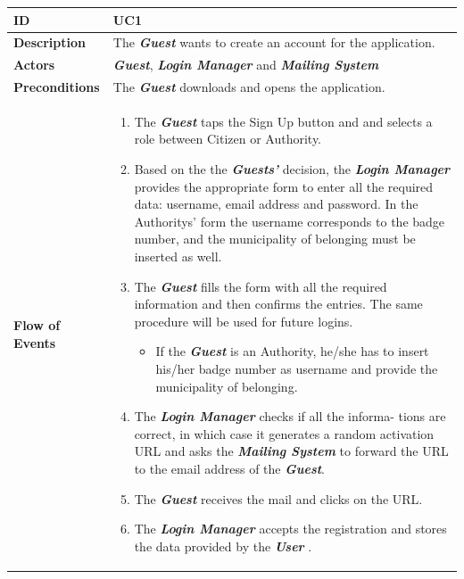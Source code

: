 \documentclass{report}
\begin{document}
\begin{tabularx}{\linewidth}{| l | X |}
	\hline
	\textbf{ID} & UC1\\
	
	\hline
	\textbf{Description} & The \textbf{\textit{Guest}} wants to create an account for the application.\\
	
	\hline
	\textbf{Actors} & \textbf{\textit{Guest}}, \textbf{\textit{Login Manager}} and \textbf{\textit{Mailing System}}\\
	
	\hline
	\textbf{Preconditions} & The \textbf{\textit{Guest}} downloads and opens the application.\\
	
	\hline
	\textbf{Flow of Events} & \parbox{0.7\textwidth}{	
		\begin{enumerate}
			\item The \textbf{\textit{Guest}} taps the Sign Up button and and selects a role between Citizen or Authority.
			\item Based on the the \textbf{\textit{Guests'}} decision, the \textbf{\textit{Login Manager}} provides the appropriate form to enter all the required data: username, email address and password. In the Authoritys' form the username corresponds to the badge number, and the municipality of belonging must be inserted as well. 
			\item The \textbf{\textit{Guest}} fills the form with all the required information and then confirms the entries. The same procedure will be used for future logins.
			\begin{itemize}
				\item If the \textbf{\textit{Guest}} is an Authority, he/she has to insert his/her badge number as username and provide the municipality of belonging.
			\end{itemize}	
			\item The \textbf{\textit{Login Manager}} checks if all the informa-
			tions are correct, in which case it generates a random activation
			URL and asks the \textbf{\textit{Mailing System}} to forward the URL to the email address of the \textbf{\textit{Guest}}.
			\item The \textbf{\textit{Guest}} receives the mail and clicks on the URL. \item The \textbf{\textit{Login Manager}} accepts the registration and stores the data provided by the \textbf{\textit{User}} .
	\end{enumerate}}\\
	

\end{tabularx}
\end{document}
